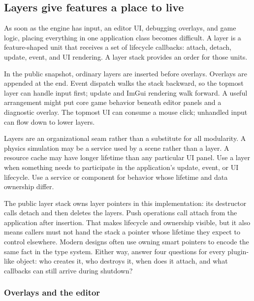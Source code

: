 \subsection{Layers give features a place to live}\label{05-engine-i-ch013-layers-give-features-a-place-to-live}

\hypertarget{05-engine-i-ch013-layers-give-features-a-place-to-live}{}

As soon as the engine has input, an editor UI, debugging overlays, and game logic, placing everything in one application class becomes difficult. A layer is a feature-shaped unit that receives a set of lifecycle callbacks: attach, detach, update, event, and UI rendering. A layer stack provides an order for those units.

In the public snapshot, ordinary layers are inserted before overlays. Overlays are appended at the end. Event dispatch walks the stack backward, so the topmost layer can handle input first; update and ImGui rendering walk forward. A useful arrangement might put core game behavior beneath editor panels and a diagnostic overlay. The topmost UI can consume a mouse click; unhandled input can flow down to lower layers.

Layers are an organizational seam rather than a substitute for all modularity. A physics simulation may be a service used by a scene rather than a layer. A resource cache may have longer lifetime than any particular UI panel. Use a layer when something needs to participate in the application's update, event, or UI lifecycle. Use a service or component for behavior whose lifetime and data ownership differ.

The public layer stack owns layer pointers in this implementation: its destructor calls detach and then deletes the layers. Push operations call attach from the application after insertion. That makes lifecycle and ownership visible, but it also means callers must not hand the stack a pointer whose lifetime they expect to control elsewhere. Modern designs often use owning smart pointers to encode the same fact in the type system. Either way, answer four questions for every plugin-like object: who creates it, who destroys it, when does it attach, and what callbacks can still arrive during shutdown?

\subsubsection{Overlays and the editor}\label{05-engine-i-ch013-overlays-and-the-editor}

